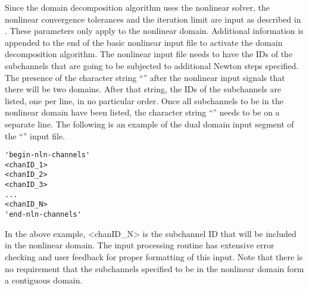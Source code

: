 Since the domain decomposition algorithm uses the nonlinear solver, the nonlinear convergence tolerances and the iteration limit are input as described in .
These parameters only apply to the nonlinear domain.
Additional information is appended to the end of the basic nonlinear input file to activate the domain decomposition algorithm.
The nonlinear input file needs to have the IDs of the subchannels that are going to be subjected to additional Newton steps specified.
The presence of the character string ``'' after the nonlinear input signals that there will be two domains.
After that string, the IDs of the subchannels are listed, one per line, in no particular order.
Once all subchannels to be in the nonlinear domain have been listed, the character string ``'' needs to be on a separate line.
The following is an example of the dual domain input segment of the ``'' input file.

{
\singlespace
\begin{verbatim}
'begin-nln-channels'
<chanID_1>
<chanID_2>
<chanID_3>
...
<chanID_N>
'end-nln-channels'
\end{verbatim}
}

In the above example, <chanID\_N> is the subchannel ID that will be included in the nonlinear domain.
The input processing routine has extensive error checking and user feedback for proper formatting of this input.
Note that there is no requirement that the subchannels specified to be in the nonlinear domain form a contiguous domain.


